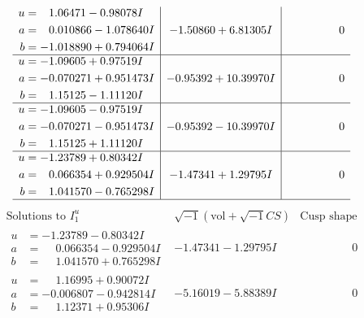 \documentclass[1p]{elsarticle_modified}
\theoremstyle{definition}
\newcommand{\I}{\sqrt{-1}}
\begin{document}
$$\begin{array}{c|c|c}
\begin{aligned}
u &= \phantom{-}1.06471 - 0.98078 I \\
a &= \phantom{-}0.010866 - 1.078640 I \\
b &= -1.018890 + 0.794064 I\end{aligned}
 & -1.50860 + 6.81305 I & \phantom{-0.000000 } 0 \\ \hline\begin{aligned}
u &= -1.09605 + 0.97519 I \\
a &= -0.070271 + 0.951473 I \\
b &= \phantom{-}1.15125 - 1.11120 I\end{aligned}
 & -0.95392 + 10.39970 I & \phantom{-0.000000 } 0 \\ \hline\begin{aligned}
u &= -1.09605 - 0.97519 I \\
a &= -0.070271 - 0.951473 I \\
b &= \phantom{-}1.15125 + 1.11120 I\end{aligned}
 & -0.95392 - 10.39970 I & \phantom{-0.000000 } 0 \\ \hline\begin{aligned}
u &= -1.23789 + 0.80342 I \\
a &= \phantom{-}0.066354 + 0.929504 I \\
b &= \phantom{-}1.041570 - 0.765298 I\end{aligned}
 & -1.47341 + 1.29795 I & \phantom{-0.000000 } 0\\
 \hline 
 \end{array}$$\newpage$$\begin{array}{c|c|c}  
\text{Solutions to }I^u_{1}& \I (\text{vol} + \sqrt{-1}CS) & \text{Cusp shape}\\
 \hline 
\begin{aligned}
u &= -1.23789 - 0.80342 I \\
a &= \phantom{-}0.066354 - 0.929504 I \\
b &= \phantom{-}1.041570 + 0.765298 I\end{aligned}
 & -1.47341 - 1.29795 I & \phantom{-0.000000 } 0 \\ \hline\begin{aligned}
u &= \phantom{-}1.16995 + 0.90072 I \\
a &= -0.006807 - 0.942814 I \\
b &= \phantom{-}1.12371 + 0.95306 I\end{aligned}
 & -5.16019 - 5.88389 I & \phantom{-0.000000 } 0 \\ \hline\begin{aligned}

\end{aligned}
\end{array}$$
\end{document}
